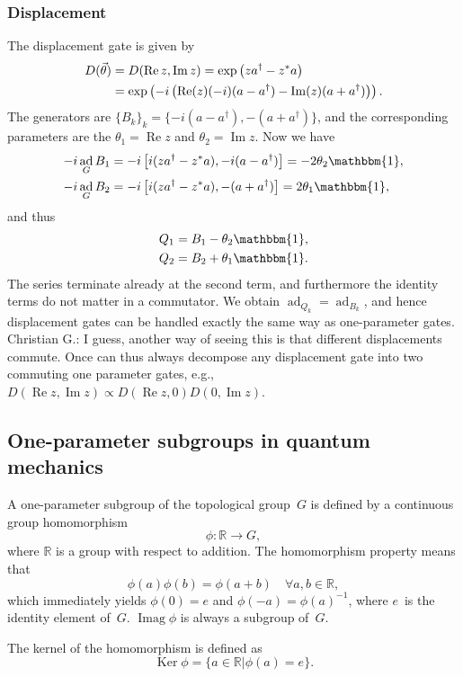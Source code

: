 \documentclass[aps,pra,10pt,twocolumn,groupedaddress,nofootinbib]{revtex4-1}
\theoremstyle{plain}
\DeclareMathOperator{\re}{Re}
\DeclareMathOperator{\im}{Im}
\DeclareMathOperator{\ad}{ad}
\DeclareMathOperator{\Ker}{Ker}    %
\DeclareMathOperator{\Imag}{Imag}  %
\newcommand{\be}{\begin{equation}}
\newcommand{\ee}{\end{equation}}
\newcommand{\R}{\ensuremath{\mathbb R}}  %
\newcommand{\I}{\mathbbm{1}} %
\newcommand{\comm}[2]{\ensuremath{\left[#1, #2\right]}}             %
\newcommand{\cg}[1]{\textcolor{cyan!80!black}{Christian G.: #1}}
\begin{document}
\subsubsection{Displacement}

The displacement gate is given by
\begin{align}
  D(\vec{\theta}) &= D(\re z, \im z) = \exp\left( za^\dagger -z^* a\right)\\
  \notag
&= \exp\left(-i\left(\re(z)(-i)(a-a^\dagger) -\im(z)(a+a^\dagger)\right)\right).
\end{align}
The generators are $\{B_k\}_k = \{-i(a-a^\dagger), -(a+a^\dagger)\}$,
and the corresponding parameters are the $\theta_1 = \re z$ and $\theta_2 = \im z$.
Now we have
\begin{align*}
  -i \ad_G B_1 &= -i\comm{i(za^\dagger -z^* a)}{-i(a-a^\dagger)}
  = -2 \theta_2 \I,\\
  -i\ad_G B_2 &= -i\comm{i(za^\dagger -z^* a)}{-(a+a^\dagger)}
  = 2 \theta_1 \I,
\end{align*}
and thus
\begin{align*}
Q_1 &= B_1 -\theta_{2} \I,\\
Q_2 &= B_2 +\theta_{1} \I.
\end{align*}
The series terminate already at the second term, and furthermore
the identity terms do not matter in a commutator.
We obtain $\ad_{Q_k} = \ad_{B_k}$, and
hence displacement gates can be handled exactly the same way as one-parameter gates.
\cg{I guess, another way of seeing this is that different displacements commute. Once can thus always decompose any displacement gate into two commuting one parameter gates, e.g., $D(\re z, \im z) \propto D(\re z, 0) D(0, \im z)$.}

\subsection{One-parameter subgroups in quantum mechanics}

A one-parameter subgroup of the topological group~$G$ is defined by a continuous group homomorphism
\be
\phi: \R \to G,
\ee
where $\R$ is a group with respect to addition.
The homomorphism property means that
\be
\phi(a)\phi(b) = \phi(a+b) \quad \forall a,b \in \R,
\ee
which immediately yields
$\phi(0) = e$ and $\phi(-a) = \phi(a)^{-1}$,
where $e$~is the identity element of~$G$.
$\Imag \phi$ is always a subgroup of~$G$.

The kernel of the homomorphism is defined as
\be
\Ker \phi = \{a \in \R | \phi(a) = e\}.
\ee
\end{document}
